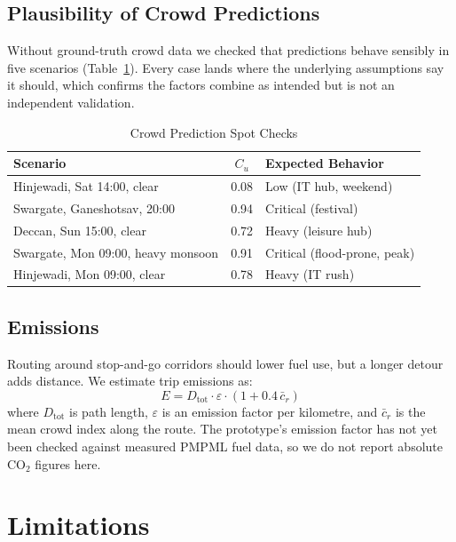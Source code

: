 \documentclass[conference]{IEEEtran}
\begin{document}
\subsection{Plausibility of Crowd Predictions}
Without ground-truth crowd data we checked that predictions behave sensibly in five scenarios (Table~\ref{tab:plausibility}). Every case lands where the underlying assumptions say it should, which confirms the factors combine as intended but is not an independent validation.

\begin{table}[h]
\caption{Crowd Prediction Spot Checks}
\label{tab:plausibility}
\centering
\begin{tabular}{p{4.2cm}cl}
\toprule
\textbf{Scenario} & $C_u$ & \textbf{Expected Behavior} \\
\midrule
Hinjewadi, Sat 14:00, clear       & 0.08 & Low (IT hub, weekend) \\
Swargate, Ganeshotsav, 20:00     & 0.94 & Critical (festival) \\
Deccan, Sun 15:00, clear          & 0.72 & Heavy (leisure hub) \\
Swargate, Mon 09:00, heavy monsoon& 0.91 & Critical (flood-prone, peak) \\
Hinjewadi, Mon 09:00, clear       & 0.78 & Heavy (IT rush) \\
\bottomrule
\end{tabular}
\end{table}

\subsection{Emissions}
Routing around stop-and-go corridors should lower fuel use, but a longer detour adds distance. We estimate trip emissions as:
\begin{equation}
E = D_{\text{tot}} \cdot \varepsilon \cdot \left(1 + 0.4\,\bar{c}_r\right)
\label{eq:emissions}
\end{equation}
where $D_{\text{tot}}$ is path length, $\varepsilon$ is an emission factor per kilometre, and $\bar{c}_r$ is the mean crowd index along the route. The prototype's emission factor has not yet been checked against measured PMPML fuel data, so we do not report absolute CO$_2$ figures here.

\section{Limitations}
\end{document}
